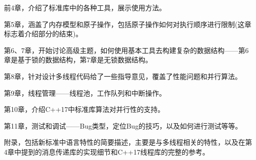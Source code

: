前4章，介绍了标准库中的各种工具，展示使用方法。

第5章，涵盖了内存模型和原子操作，包括原子操作如何对执行顺序进行限制(这章标志着介绍部分的结束)。

第6、7章，开始讨论高级主题，如何使用基本工具去构建复杂的数据结构——第6章是基于锁的数据结构，第7章是无锁数据结构。

第8章，针对设计多线程代码给了一些指导意见，覆盖了性能问题和并行算法。

第9章，线程管理——线程池，工作队列和中断操作。

第10章，介绍C++17中标准库算法对并行性的支持。

第11章，测试和调试——Bug类型，定位Bug的技巧，以及如何进行测试等等。

附录，包括新标准中语言特性的简要描述，主要是与多线程相关的特性，以及在第4章中提到的消息传递库的实现细节和C++17线程库的完整的参考。